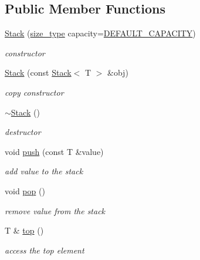\subsection*{Public Member Functions}
\begin{DoxyCompactItemize}
\item 
\hyperlink{class_my_namespace_1_1_stack_a303e8345a585ffac7457f57ac920a54f}{Stack} (\hyperlink{class_my_namespace_1_1_stack_a19c43f92e11d91ed645058833af88a86}{size\+\_\+type} capacity=\hyperlink{class_my_namespace_1_1_stack_a4b75778037e106878d008d6a859dad27}{D\+E\+F\+A\+U\+L\+T\+\_\+\+C\+A\+P\+A\+C\+I\+TY})
\begin{DoxyCompactList}\small\item\em constructor \end{DoxyCompactList}\item 
\hyperlink{class_my_namespace_1_1_stack_ac6edf3e896990925caf2acc2939066bd}{Stack} (const \hyperlink{class_my_namespace_1_1_stack}{Stack}$<$ T $>$ \&obj)
\begin{DoxyCompactList}\small\item\em copy constructor \end{DoxyCompactList}\item 
\hyperlink{class_my_namespace_1_1_stack_a40bd5dff912f0e5290777c4b46d17809}{$\sim$\+Stack} ()
\begin{DoxyCompactList}\small\item\em destructor \end{DoxyCompactList}\item 
void \hyperlink{class_my_namespace_1_1_stack_a7066fcb88effbe19f464f8f635efcbc5}{push} (const T \&value)
\begin{DoxyCompactList}\small\item\em add value to the stack \end{DoxyCompactList}\item 
void \hyperlink{class_my_namespace_1_1_stack_a09e820f3c3531cf3f401af3b3ca5d56f}{pop} ()
\begin{DoxyCompactList}\small\item\em remove value from the stack \end{DoxyCompactList}\item 
T \& \hyperlink{class_my_namespace_1_1_stack_a20e64b09239efa6340b33546115424b6}{top} ()
\begin{DoxyCompactList}\small\item\em access the top element \end{DoxyCompactList}\item 

\end{DoxyCompactItemize}
